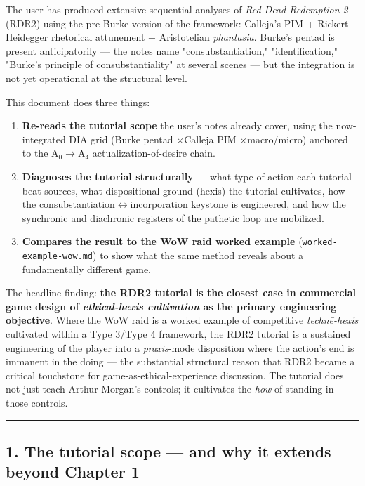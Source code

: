 \documentclass[11pt]{report}
\begin{document}
The user has produced extensive sequential analyses of \textit{Red Dead Redemption 2} (RDR2) using the pre-Burke version of the framework: Calleja's PIM + Rickert-Heidegger rhetorical attunement + Aristotelian \textit{phantasia}. Burke's pentad is present anticipatorily — the notes name "consubstantiation," "identification," "Burke's principle of consubstantiality" at several scenes — but the integration is not yet operational at the structural level.


This document does three things:


\begin{enumerate}
\item \textbf{Re-reads the tutorial scope} the user's notes already cover, using the now-integrated DIA grid (Burke pentad $\times$\allowbreak  Calleja PIM $\times$\allowbreak  macro/micro) anchored to the A$_0$$\rightarrow$\allowbreak A$_4$ actualization-of-desire chain.
\item \textbf{Diagnoses the tutorial structurally} — what type of action each tutorial beat sources, what dispositional ground (hexis) the tutorial cultivates, how the consubstantiation$\leftrightarrow$\allowbreak incorporation keystone is engineered, and how the synchronic and diachronic registers of the pathetic loop are mobilized.
\item \textbf{Compares the result to the WoW raid worked example} (\texttt{worked-\discretionary{}{}{}example-\discretionary{}{}{}wow.\discretionary{}{}{}md}) to show what the same method reveals about a fundamentally different game.
\end{enumerate}


The headline finding: \textbf{the RDR2 tutorial is the closest case in commercial game design of \textit{ethical-hexis cultivation} as the primary engineering objective}. Where the WoW raid is a worked example of competitive \textit{technē-hexis} cultivated within a Type 3/Type 4 framework, the RDR2 tutorial is a sustained engineering of the player into a \textit{praxis}-mode disposition where the action's end is immanent in the doing — the substantial structural reason that RDR2 became a critical touchstone for game-as-ethical-experience discussion. The tutorial does not just teach Arthur Morgan's controls; it cultivates the \textit{how} of standing in those controls.


\vspace{0.4em}\hrule\vspace{0.8em}


\subsection{1. The tutorial scope — and why it extends beyond Chapter 1}
\end{document}

